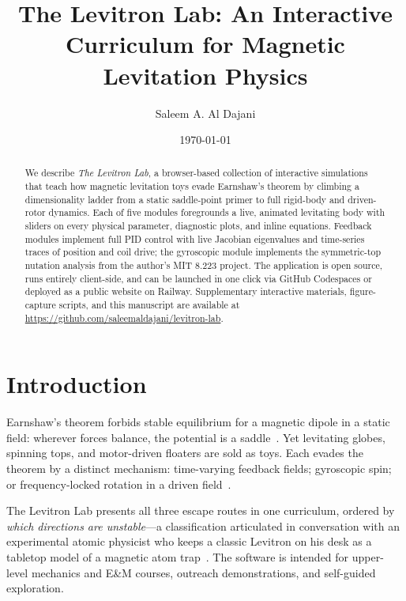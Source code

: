 \documentclass[aapm,ajp,amsmath,amssymb,reprint]{revtex4-2}
\begin{document}
\title{The Levitron Lab: An Interactive Curriculum for Magnetic Levitation Physics}

\author{Saleem A. Al Dajani}

\date{\today}

\begin{abstract}
We describe \emph{The Levitron Lab}, a browser-based collection of interactive simulations that teach how magnetic levitation toys evade Earnshaw's theorem by climbing a dimensionality ladder from a static saddle-point primer to full rigid-body and driven-rotor dynamics. Each of five modules foregrounds a live, animated levitating body with sliders on every physical parameter, diagnostic plots, and inline equations. Feedback modules implement full PID control with live Jacobian eigenvalues and time-series traces of position and coil drive; the gyroscopic module implements the symmetric-top nutation analysis from the author's MIT 8.223 project. The application is open source, runs entirely client-side, and can be launched in one click via GitHub Codespaces or deployed as a public website on Railway. Supplementary interactive materials, figure-capture scripts, and this manuscript are available at \url{https://github.com/saleemaldajani/levitron-lab}.
\end{abstract}

\maketitle

\section{Introduction}
\label{sec:intro}

Earnshaw's theorem forbids stable equilibrium for a magnetic dipole in a static field: wherever forces balance, the potential is a saddle~\cite{simon}. Yet levitating globes, spinning tops, and motor-driven floaters are sold as toys. Each evades the theorem by a distinct mechanism: time-varying feedback fields; gyroscopic spin; or frequency-locked rotation in a driven field~\cite{berry,hermansen,doff}.

The Levitron Lab presents all three escape routes in one curriculum, ordered by \emph{which directions are unstable}---a classification articulated in conversation with an experimental atomic physicist who keeps a classic Levitron on his desk as a tabletop model of a magnetic atom trap~\cite{ketterle}. The software is intended for upper-level mechanics and E\&M courses, outreach demonstrations, and self-guided exploration.
\end{document}
